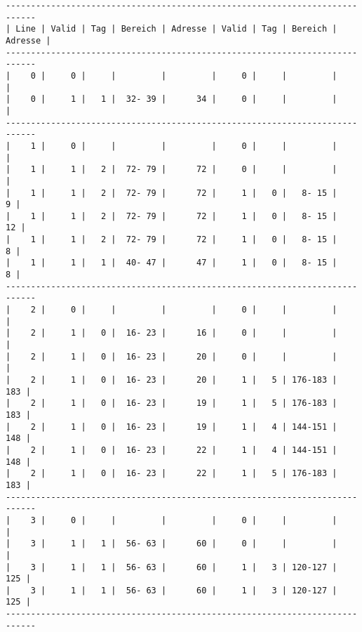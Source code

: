 \documentclass[10pt,a4paper]{article}
\begin{document}
\begin{lstlisting}
----------------------------------------------------------------------------
| Line | Valid | Tag | Bereich | Adresse | Valid | Tag | Bereich | Adresse |
----------------------------------------------------------------------------
|    0 |     0 |     |         |         |     0 |     |         |         |
|    0 |     1 |   1 |  32- 39 |      34 |     0 |     |         |         |
----------------------------------------------------------------------------
|    1 |     0 |     |         |         |     0 |     |         |         |
|    1 |     1 |   2 |  72- 79 |      72 |     0 |     |         |         |
|    1 |     1 |   2 |  72- 79 |      72 |     1 |   0 |   8- 15 |       9 |
|    1 |     1 |   2 |  72- 79 |      72 |     1 |   0 |   8- 15 |      12 |
|    1 |     1 |   2 |  72- 79 |      72 |     1 |   0 |   8- 15 |       8 |
|    1 |     1 |   1 |  40- 47 |      47 |     1 |   0 |   8- 15 |       8 |
----------------------------------------------------------------------------
|    2 |     0 |     |         |         |     0 |     |         |         |
|    2 |     1 |   0 |  16- 23 |      16 |     0 |     |         |         |
|    2 |     1 |   0 |  16- 23 |      20 |     0 |     |         |         |
|    2 |     1 |   0 |  16- 23 |      20 |     1 |   5 | 176-183 |     183 |
|    2 |     1 |   0 |  16- 23 |      19 |     1 |   5 | 176-183 |     183 |
|    2 |     1 |   0 |  16- 23 |      19 |     1 |   4 | 144-151 |     148 |
|    2 |     1 |   0 |  16- 23 |      22 |     1 |   4 | 144-151 |     148 |
|    2 |     1 |   0 |  16- 23 |      22 |     1 |   5 | 176-183 |     183 |
----------------------------------------------------------------------------
|    3 |     0 |     |         |         |     0 |     |         |         |
|    3 |     1 |   1 |  56- 63 |      60 |     0 |     |         |         |
|    3 |     1 |   1 |  56- 63 |      60 |     1 |   3 | 120-127 |     125 |
|    3 |     1 |   1 |  56- 63 |      60 |     1 |   3 | 120-127 |     125 |
----------------------------------------------------------------------------
\end{lstlisting}
\end{document}
